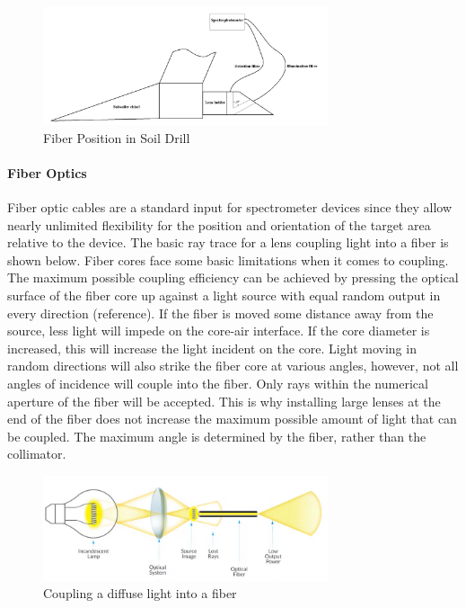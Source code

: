 \begin{figure}[H]
    \caption{Fiber Position in Soil Drill}
    \centering
    \includegraphics[width=0.75\textwidth]{images/Acrylic Block Fiber positioner.png}
\end{figure}

\paragraph{Fiber Optics} Fiber optic cables are a standard input for spectrometer devices since they allow nearly unlimited flexibility for the position and orientation of the target area relative to the device. The basic ray trace for a lens coupling light into a fiber is shown below. Fiber cores face some basic limitations when it comes to coupling. The maximum possible coupling efficiency can be achieved by pressing the optical surface of the fiber core up against a light source with equal random output in every direction (reference). If the fiber is moved some distance away from the source, less light will impede on the core-air interface. If the core diameter is increased, this will increase the light incident on the core. Light moving in random directions will also strike the fiber core at various angles, however, not all angles of incidence will couple into the fiber. Only rays within the numerical aperture of the fiber will be accepted. This is why installing large lenses at the end of the fiber does not increase the maximum possible amount of light that can be coupled. The maximum angle is determined by the fiber, rather than the collimator.

\begin{figure}[H]
    \caption{Coupling a diffuse light into a fiber}
    \centering
    \includegraphics[width=0.75\textwidth]{images/CouplingDiffuseLighttoFiber.png}
\end{figure}

